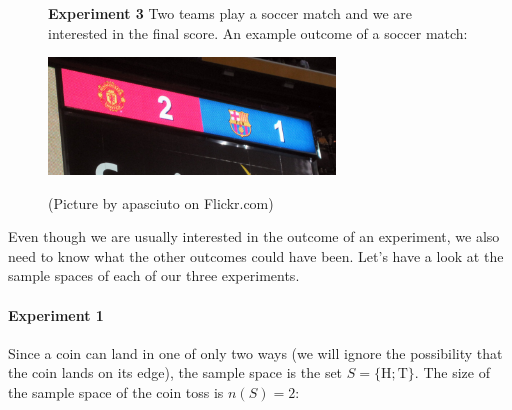 \begin{figure}[H]
  \textbf{Experiment 3} Two teams play a soccer match and we are
  interested in the final score. An example outcome of a soccer match:

  \begin{center}
    \includegraphics[width=3in]{Gr10-Probability-images/5996076302_412ec8d8d0_o.jpg}
 \\
  \begin{caption*}{(Picture by apasciuto on Flickr.com)}\end{caption*}
 \end{center}
\end{figure}


Even though we are usually interested in the outcome of an experiment,
we also need to know what the other outcomes could have been. Let's
have a look at the sample spaces of each of our three experiments.

\paragraph{Experiment 1} Since a coin can land in one of only two ways
(we will ignore the possibility that the coin lands on its edge), the
sample space is the set \(S=\{\mbox{H}; \mbox{T}\}\). The size of the sample space of the coin toss
is \(n(S)=2\):

\begin{figure}[H]
  \begin{center}
  \end{center}
\end{figure} 

